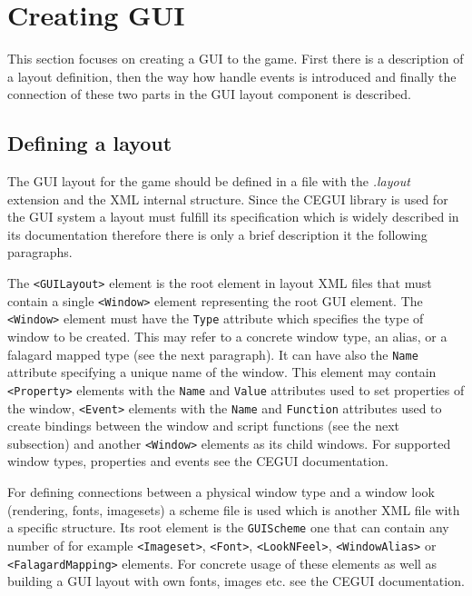 \section{Creating GUI}
\label{sec:gui-creating}

This section focuses on creating a GUI to the game. First there is a description of a layout definition, then the way how handle events is introduced and finally the connection of these two parts in the GUI layout component is described.

\subsection{Defining a layout}

The GUI layout for the game should be defined in a file with the \emph{.layout} extension and the XML internal structure. Since the CEGUI library is used for the GUI system a layout must fulfill its specification which is widely described in its documentation \cite{cegui} therefore there is only a brief description it the following paragraphs.

The \verb/<GUILayout>/ element is the root element in layout XML files that must contain a single \verb/<Window>/ element representing the root GUI element. The \verb/<Window>/ element must have the \verb/Type/ attribute which specifies the type of window to be created. This may refer to a concrete window type, an alias, or a falagard mapped type (see the next paragraph). It can have also the \verb/Name/ attribute specifying a unique name of the window. This element may contain \verb/<Property>/ elements with the \verb/Name/ and \verb/Value/ attributes used to set properties of the window, \verb/<Event>/ elements with the \verb/Name/ and \verb/Function/ attributes used to create bindings between the window and script functions (see the next subsection) and another \verb/<Window>/ elements as its child windows. For supported window types, properties and events see the CEGUI documentation.

For defining connections between a physical window type and a window look (rendering, fonts, imagesets) a scheme file is used which is another XML file with a specific structure. Its root element is the \verb/GUIScheme/ one that can contain any number of for example \verb/<Imageset>/, \verb/<Font>/, \verb/<LookNFeel>/, \verb/<WindowAlias>/ or \verb/<FalagardMapping>/ elements. For concrete usage of these elements as well as building a GUI layout with own fonts, images etc. see the CEGUI documentation.

